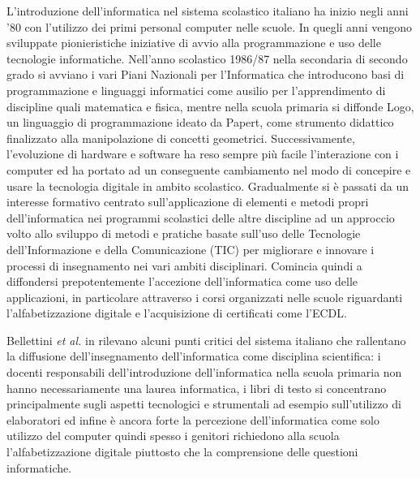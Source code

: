 \documentclass[12pt]{report}
\begin{document}
L'introduzione dell'informatica nel sistema scolastico italiano ha inizio negli anni '80 con l’utilizzo dei primi personal computer nelle scuole. In quegli anni vengono sviluppate pionieristiche iniziative di avvio alla programmazione e uso delle tecnologie informatiche. Nell'anno scolastico 1986/87 nella secondaria di secondo grado si avviano i vari Piani Nazionali per l’Informatica che introducono basi di programmazione e linguaggi informatici come ausilio per l'apprendimento di discipline quali matematica e fisica, mentre nella scuola primaria si diffonde Logo, un linguaggio di programmazione ideato da Papert, come strumento didattico finalizzato alla manipolazione di concetti geometrici.
Successivamente, l'evoluzione di hardware e software ha reso sempre più facile l'interazione con i computer ed ha portato ad un conseguente cambiamento nel modo di concepire e usare la tecnologia digitale in ambito scolastico. Gradualmente si è passati da un interesse formativo centrato sull'applicazione di elementi e metodi propri dell'informatica nei programmi scolastici delle altre discipline ad un approccio volto allo sviluppo di metodi e pratiche basate sull'uso delle Tecnologie dell'Informazione e della Comunicazione (TIC) per migliorare e innovare i processi di insegnamento nei vari ambiti disciplinari. Comincia quindi a diffondersi prepotentemente l'accezione dell'informatica come uso delle applicazioni, in particolare attraverso i corsi organizzati nelle scuole riguardanti l'alfabetizzazione digitale e l'acquisizione di certificati come l'ECDL.


Bellettini \textit{et al.} in \cite{BellettiniTOCE2014} rilevano alcuni punti critici del sistema italiano che rallentano la diffusione dell'insegnamento dell'informatica come disciplina scientifica: i docenti responsabili dell'introduzione dell'informatica nella scuola primaria non hanno necessariamente una laurea informatica, i libri di testo si concentrano principalmente sugli aspetti tecnologici e strumentali ad esempio sull'utilizzo di elaboratori ed infine è ancora forte la percezione dell'informatica come solo utilizzo del computer quindi spesso i genitori richiedono alla scuola l'alfabetizzazione digitale piuttosto che la comprensione delle questioni informatiche.
\end{document}

